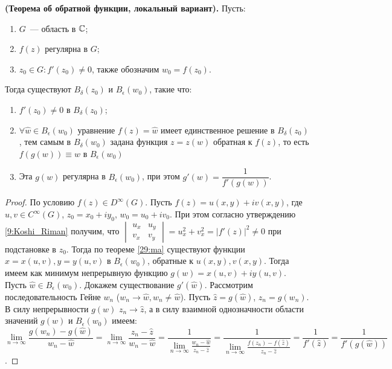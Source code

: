 \begin{statement}
\textbf{(Теорема об обратной функции, локальный вариант).} Пусть:
\begin{enumerate}[wide=20pt, itemsep=0ex]
\item \(G\)~--- область в \(\mathbb{C}\);
\item \(f(z)\) регулярна в \(G\);
\item \(z_0 \in G\colon f'(z_0) \ne 0\), также обозначим \(w_0 = f(z_0)\).
\end{enumerate}
Тогда существуют \(B_\delta(z_0)\) и \(B_\epsilon(w_0)\), такие что:
\begin{enumerate}[wide=20pt, itemsep=0ex]
\item \(f'(z_0) \ne 0\) в \(B_\delta (z_0)\);
\item \(\forall \hat{w} \in B_\epsilon(w_0)\) уравнение \(f(z) = \hat{w}\) имеет единственное
    решение в \(B_\delta(z_0)\), тем самым в \(B_\delta(w_0)\) задана функция \(z = z(w)\) обратная
    к \(f(z)\), то есть \(f(g(w)) \equiv w\) в \(B_\epsilon(w_0)\)
\item Эта \(g(w)\) регулярна в \(B_\epsilon(w_0)\), при этом \(g'(w) = \dfrac{1}{f'(g(w))}\).
\end{enumerate}
\end{statement}

\begin{proof}
По условию \(f(z) \in D^\infty(G)\). Пусть \(f(z) = u(x, y) + iv(x, y)\), где \(u, v \in 
C^\infty(G)\), \(z_0 = x_0 + iy_0\), \(w_0 = u_0 + iv_0\). При этом согласно утверждению 
\ref{9:Koshi_Riman} получим, что \(\begin{vmatrix} u_x & u_y \\ v_x & v_y \end{vmatrix} = u_x^2 + 
v_x^2 = |f'(z)|^2 \ne 0\) при подстановке в \(z_0\). Тогда по теореме \ref{29:ma} существуют
функции \(x = x(u, v), y = y(u, v)\) в \(B_\epsilon(w_0)\), обратные к \(u(x, y), v(x,y)\). Тогда
имеем как минимум непрерывную функцию \(g(w) = x(u, v) + iy(u, v)\). Пусть \(\hat{w} \in 
B_\epsilon(w_0)\). Докажем существование \(g'(\hat{w})\). Рассмотрим последовательность Гейне
\(w_n\) (\(w_n \to \hat{w}, w_n \ne \hat{w}\)). Пусть \(\hat{z} = g(\hat{w})\), \(z_n = g(w_n)\).
В силу непрерывности \(g(w)\) \(z_n \to \hat{z}\), а в силу взаимной однозначности области значений
\(g(w)\) и \(B_\epsilon(w_0)\) имеем: \(\lim\limits_{n \to \infty} \dfrac{g(w_n) - g(\hat{w})}{w_n -
\hat{w}} = \lim\limits_{n \to \infty} \dfrac{z_n - \hat{z}}{w_n - \hat{w}} = \dfrac{1}{\lim\limits_
{n \to \infty} \frac{w_n - \hat{w}}{z_n - \hat{z}}} = \dfrac{1}{\lim\limits_
{n \to \infty} \frac{f(z_n) - f(\hat{z})}{z_n - \hat{z}}} = \dfrac{1}{f'(\hat{z})} = \dfrac{1}
{f'(g(\hat{w}))}\).
\end{proof}


